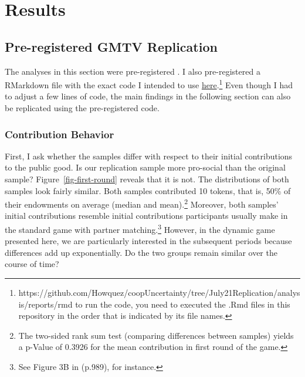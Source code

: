 \documentclass[
  authoryear,
  preprint,
  3p]{elsarticle}
\begin{document}
\hypertarget{sec-results}{%
\section{Results}\label{sec-results}}

\hypertarget{sec-replication}{%
\subsection{Pre-registered GMTV Replication}\label{sec-replication}}

The analyses in this section were pre-registered
\citep{preregistration}. I also pre-registered a RMarkdown file with the
exact code I intended to use
\href{https://github.com/Howquez/coopUncertainty/blob/July21Replication/analysis/reports/rmd}{here}.\footnote{https://github.com/Howquez/coopUncertainty/tree/July21Replication/analysis/reports/rmd
  to run the code, you need to executed the .Rmd files in this
  repository in the order that is indicated by its file names.} Even
though I had to adjust a few lines of code, the main findings in the
following section can also be replicated using the pre-registered code.

\hypertarget{sec-contributions}{%
\subsubsection{Contribution Behavior}\label{sec-contributions}}

First, I ask whether the samples differ with respect to their initial
contributions to the public good. Is our replication sample more
pro-social than the original sample? Figure~\ref{fig-first-round}
reveals that it is not. The distributions of both samples look fairly
similar. Both samples contributed 10 tokens, that is, 50\% of their
endowments on average (median and mean).\footnote{The two-sided rank sum
  test (comparing differences between samples) yields a p-Value of
  0.3926 for the mean contribution in first round of the game.}
Moreover, both samples' initial contributions resemble initial
contributions participants usually make in the standard game with
partner matching.\footnote{See Figure 3B in \citet{fehrgaechter2000}
  (p.989), for instance.} However, in the dynamic game presented here,
we are particularly interested in the subsequent periods because
differences add up exponentially. Do the two groups remain similar over
the course of time?
\end{document}
